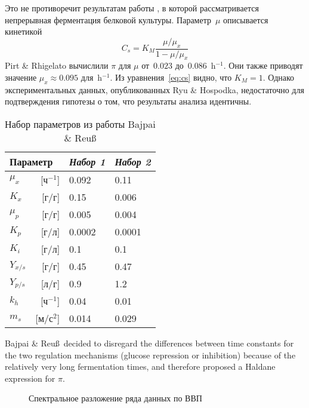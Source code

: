 \documentclass[final,pdftex]{epsilonj}
\numberwithin{equation}{section}
\begin{document}
Это не противоречит результатам работы \cite{risch70}, в которой рассматривается непрерывная ферментация белковой культуры. Параметр~$\mu$ описывается кинетикой
\begin{equation}\label{eq:cs}
    C_{s}  =  K_{M} \frac{\mu/\mu_{x}}{1-\mu/\mu_{x}} 
\end{equation}
Pirt \& Rhigelato вычислили $\pi$ для $\mu$ от~$0.023$ до~$0.086$~h$^{-1}$. Они также приводят значение $\mu_{x} \approx 0.095$ для~h$^{-1}$. Из уравнения~\eqref{eq:cs} видно, что $K_{M}=1$. Однако экспериментальных данных, опубликованных Ryu \& Hospodka, недостаточно для подтверждения гипотезы о том, что результаты анализа идентичны.

\begin{table}
\centering
\begin{tabular}{lrll}
\toprule
\multicolumn{2}{l}{Параметр} & {\it Набор 1} & {\it Набор 2}\\
\midrule
$\mu_{x}$           & [ч$^{-1}$]  & 0.092       & 0.11          \\
$K_{x}$             & [г/г]     & 0.15        & 0.006         \\
$\mu_{p}$           & [г/г]  & 0.005       & 0.004         \\
$K_{p}$             & [г/л]        & 0.0002      & 0.0001        \\
$K_{i}$             & [г/л]        & 0.1         & 0.1           \\
$Y_{x/s}$           & [г/г]     & 0.45        & 0.47          \\
$Y_{p/s}$           & [л/г]        & 0.9         & 1.2           \\
$k_{h}$             & [ч$^{-1}$]  & 0.04        & 0.01          \\
$m_{s}$             & [м/с${}^2$]  & 0.014       & 0.029         \\
\bottomrule
\end{tabular}
\caption{Набор параметров из работы Bajpai \& Reu\ss}\label{tab:parset}
\end{table}

Bajpai \& Reu\ss\ decided to disregard the
differences between time constants for the two regulation mechanisms
(glucose repression or inhibition) because of the
relatively very long fermentation times, and therefore proposed a Haldane
expression for $\pi$.


\begin{figure} %
\caption{Спектральное разложение ряда данных по ВВП}
\label{penG}
\end{figure}
\end{document}

